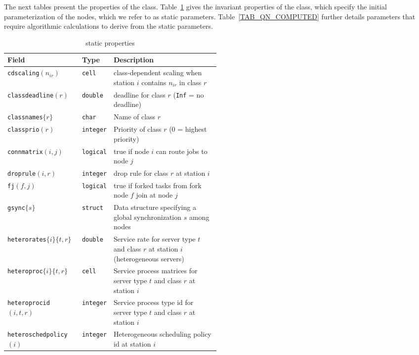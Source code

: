 \begin{MATLAB}
The next tables present the properties of the  class. Table~\ref{TAB_QN} gives the invariant properties of the class, which specify the initial parameterization of the nodes, which we refer to as static parameters. Table~\ref{TAB_QN_COMPUTED} further details parameters that require algorithmic calculations to derive from the static parameters.
\begin{table}[thbp]
{\scriptsize
\renewcommand{\arraystretch}{1.2}
\centering
\caption{ static properties}\label{TAB_QN}
\begin{tabular}{|l|l|p{0.5\linewidth}|}
\hline
\textbf{Field} & \textbf{Type} & \textbf{Description} \\
\hline
{\texttt{cdscaling}}$(n_{ir})$ & \texttt{cell} & class-dependent scaling when station $i$ contains $n_{ir}$ in class $r$\\\hline
\texttt{classdeadline}$(r)$ & \texttt{double} & deadline for class $r$ (\texttt{Inf} = no deadline)\\\hline
\texttt{classnames}$\{r\}$ & \texttt{char} & Name of class $r$\\\hline
\texttt{classprio}$(r)$ & \texttt{integer} & Priority of class $r$ (0 = highest priority)\\\hline
\texttt{connmatrix}$(i,j)$ & \texttt{logical} & true if node $i$ can route jobs to node $j$\\\hline
\texttt{droprule}$(i,r)$ & \texttt{integer} & drop rule for class $r$ at station $i$\\\hline
\texttt{fj}$(f,j)$ & \texttt{logical} & true if forked tasks from fork node $f$ join at node $j$\\\hline
\texttt{gsync}$\{s\}$ & \texttt{struct} & Data structure specifying a global synchronization $s$ among nodes\\\hline
\texttt{heterorates}$\{i\}\{t,r\}$ & \texttt{double} & Service rate for server type $t$ and class $r$ at station $i$ (heterogeneous servers)\\\hline
\texttt{heteroproc}$\{i\}\{t,r\}$ & \texttt{cell} & Service process matrices for server type $t$ and class $r$ at station $i$\\\hline
\texttt{heteroprocid}$(i,t,r)$ & \texttt{integer} & Service process type id for server type $t$ and class $r$ at station $i$\\\hline
\texttt{heteroschedpolicy}$(i)$ & \texttt{integer} & Heterogeneous scheduling policy id at station $i$\\\hline

\end{tabular}}
\end{table}
\end{MATLAB}
